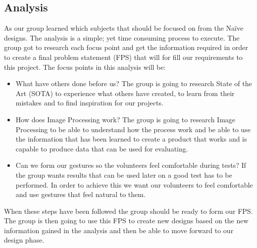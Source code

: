 \subsection{Analysis}
As our group learned which subjects that should be focused on from the Naïve designs. The analysis is a simple; yet time consuming process to execute. The group got to research each focus point and get the information required in order to create a final problem statement (FPS) that will for fill our requirements to this project. The focus points in this analysis will be:
\begin{itemize}
\item What have others done before us? \newline
The group is going to research State of the Art (SOTA) to experience what others 	have created, to learn from their mistakes and to find inspiration for our projects. 

\item How does Image Processing work? \newline
The group is going to research Image Processing to be able to understand how the 	process work and be able to use the information that has been learned to create a product that works and is capable to produce data that can be used for evaluating.

\item Can we form our gestures so the volunteers feel comfortable during tests? \newline
If the group wants results that can be used later on a good test has to be performed. In order to achieve this we want our volunteers to feel comfortable and use gestures that feel natural to them. 

\end{itemize} 
\pagebreak[1]
When these steps have been followed the group should be ready to form our FPS. The group is then going to use this FPS to create new designs based on the new information gained in the analysis and then be able to move forward to our design phase.
